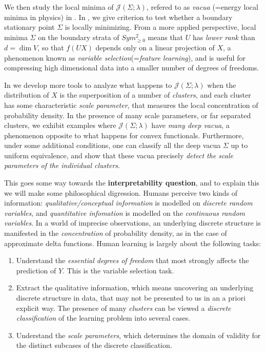 \documentclass[a4paper]{article}
\theoremstyle{definition}
\newcommand{\1}{\mathbbm{1}}
\begin{document}
	
	
	We then study the local minima of $\mathcal{J}(\Sigma;\lambda)$, refered to as \emph{vacua} (=energy local minima in physics) in \cite{RuanLi}. In \cite[Section 5]{RuanLi}, we give criterion to test whether a boundary stationary point $\Sigma$ is locally minimizing. From a more applied perspective, local minima $\Sigma$ on the boundary strata of $Sym^2_{\geq 0}$ means that $U$ has \emph{lower rank} than $d=\dim V$, so that $f(UX)$ depends only on a linear projection of $X$, a phenomenon known as \emph{variable selection}(=\emph{feature learning}), and is useful for compressing high dimensional data into a smaller number of degrees of freedoms. 
	
	
	
	
	In \cite[Section 6, 7]{RuanLi}  we develop more tools to analyze what happens to $\mathcal{J}(\Sigma;\lambda)$ when the distribution of $X$ is the superposition of a number of \emph{clusters}, and each cluster has some characteristic \emph{scale parameter}, that measures the local concentration of probability density. In the presence of many scale parameters, or far separated clusters, we exhibit examples where $\mathcal{J}(\Sigma;\lambda)$ have \emph{many deep vacua}, a phenomenon  opposite to what happens for convex functionals. Furthermore, under some additional conditions, one can classify all the deep vacua $\Sigma$ up to uniform equivalence, and show that these vacua precisely \emph{detect the scale parameters of the individual clusters}.
	
	
	
	This goes some way towards the \textbf{interpretability question}, and to explain this we will make some philosophical digression. Humans perceive two kinds of information: \emph{qualitative/conceptual information} is modelled on \emph{discrete random variables}, and \emph{quantitative infomation} is modelled on the \emph{continuous random variables}. In a world of imprecise observations, an underlying discrete structure is manifested in the \emph{concentration} of probability density, as in the case of approximate delta functions. Human learning is largely about the following tasks:
	\begin{enumerate}
		
		\item Understand the \emph{essential degrees of freedom} that most strongly affects the prediction of $Y$. This is the variable selection task.
		
		\item  Extract the qualitative information, which means uncovering an underlying discrete structure in data, that may not be presented to us in an a priori explicit way. The presence of many \emph{clusters} can be viewed a \emph{discrete classification} of the learning problem into several cases.
		
		\item  Understand the \emph{scale parameters}, which determines the domain of validity for the distinct subcases of the discrete classification. 
	\end{enumerate}
	
\end{document}
